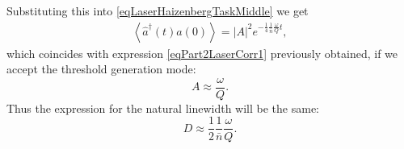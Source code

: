 Substituting this into \eqref{eqLaserHaizenbergTaskMiddle} we get
\begin{eqnarray}
\left<\hat{a}^{\dag}\left(t\right)\hat{a}\left(0\right)\right> =
\left|A\right|^2 e^{-\frac{1}{4}\frac{1}{\bar{n}}\frac{\omega}{Q} t},
\label{eqLaserHaizenbergTaskMiddleFinal}
\end{eqnarray}
which coincides with expression \eqref{eqPart2LaserCorr1} previously obtained,
if we accept the threshold generation mode: 
\[
A \approx \frac{\omega}{Q}.
\]
Thus the expression for the natural linewidth will be the same:
\[
D \approx \frac{1}{2}\frac{1}{\bar{n}}\frac{\omega}{Q}.
\]

